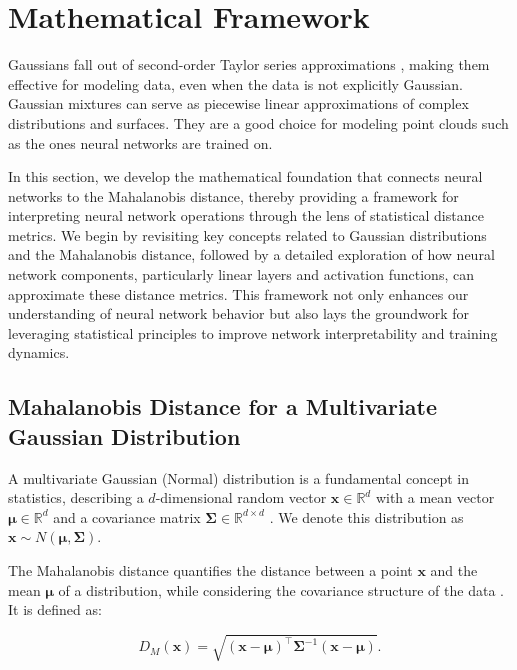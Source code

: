 
\section{Mathematical Framework}
\label{sec:math_framework}
Gaussians fall out of second-order Taylor series approximations \citep[Section 4.4]{bishop2006pattern}, making them effective for modeling data, even when the data is not explicitly Gaussian. Gaussian mixtures can serve as piecewise linear approximations of complex distributions and surfaces. They are a good choice for modeling point clouds such as the ones neural networks are trained on.

In this section, we develop the mathematical foundation that connects neural networks to the Mahalanobis distance, thereby providing a framework for interpreting neural network operations through the lens of statistical distance metrics. We begin by revisiting key concepts related to Gaussian distributions and the Mahalanobis distance, followed by a detailed exploration of how neural network components, particularly linear layers and activation functions, can approximate these distance metrics. This framework not only enhances our understanding of neural network behavior but also lays the groundwork for leveraging statistical principles to improve network interpretability and training dynamics.

\subsection{Mahalanobis Distance for a Multivariate Gaussian Distribution}

A multivariate Gaussian (Normal) distribution is a fundamental concept in statistics, describing a \(d\)-dimensional random vector \(\mathbf{x} \in \mathbb{R}^d\) with a mean vector \(\boldsymbol{\mu} \in \mathbb{R}^d\) and a covariance matrix \(\boldsymbol{\Sigma} \in \mathbb{R}^{d \times d}\) \citep{bishop2006pattern}. We denote this distribution as \(\mathbf{x} \sim N(\boldsymbol{\mu}, \boldsymbol{\Sigma})\).

The Mahalanobis distance quantifies the distance between a point \(\mathbf{x}\) and the mean \(\boldsymbol{\mu}\) of a distribution, while considering the covariance structure of the data \citep{mahalanobis1936generalized, demaesschalck2000mahalanobis}. It is defined as:

\begin{equation}
\label{eq:mahalanobis_distance}
D_M(\mathbf{x}) = \sqrt{ (\mathbf{x} - \boldsymbol{\mu})^\top \boldsymbol{\Sigma}^{-1} (\mathbf{x} - \boldsymbol{\mu}) }.
\end{equation}

